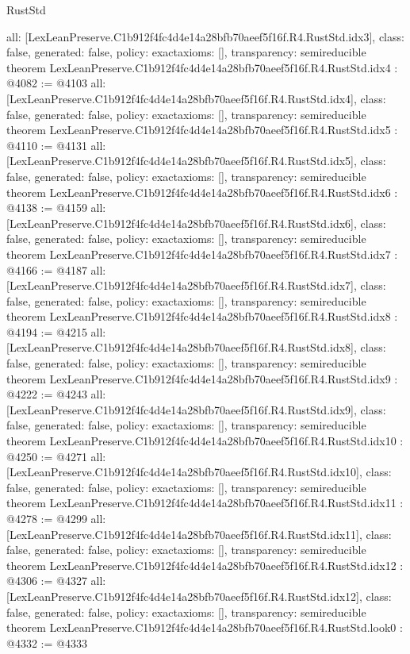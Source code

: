 \begin{lexlean}{RustStd}
\begin{coremodule}
{  all: [LexLeanPreserve.C1b912f4fc4d4e14a28bfb70aeef5f16f.R4.RustStd.idx3],
  class: false,
  generated: false,
  policy: exact{axioms: []},
  transparency: semireducible
}
theorem LexLeanPreserve.C1b912f4fc4d4e14a28bfb70aeef5f16f.R4.RustStd.idx4 : @4082 := @4103 {
  all: [LexLeanPreserve.C1b912f4fc4d4e14a28bfb70aeef5f16f.R4.RustStd.idx4],
  class: false,
  generated: false,
  policy: exact{axioms: []},
  transparency: semireducible
}
theorem LexLeanPreserve.C1b912f4fc4d4e14a28bfb70aeef5f16f.R4.RustStd.idx5 : @4110 := @4131 {
  all: [LexLeanPreserve.C1b912f4fc4d4e14a28bfb70aeef5f16f.R4.RustStd.idx5],
  class: false,
  generated: false,
  policy: exact{axioms: []},
  transparency: semireducible
}
theorem LexLeanPreserve.C1b912f4fc4d4e14a28bfb70aeef5f16f.R4.RustStd.idx6 : @4138 := @4159 {
  all: [LexLeanPreserve.C1b912f4fc4d4e14a28bfb70aeef5f16f.R4.RustStd.idx6],
  class: false,
  generated: false,
  policy: exact{axioms: []},
  transparency: semireducible
}
theorem LexLeanPreserve.C1b912f4fc4d4e14a28bfb70aeef5f16f.R4.RustStd.idx7 : @4166 := @4187 {
  all: [LexLeanPreserve.C1b912f4fc4d4e14a28bfb70aeef5f16f.R4.RustStd.idx7],
  class: false,
  generated: false,
  policy: exact{axioms: []},
  transparency: semireducible
}
theorem LexLeanPreserve.C1b912f4fc4d4e14a28bfb70aeef5f16f.R4.RustStd.idx8 : @4194 := @4215 {
  all: [LexLeanPreserve.C1b912f4fc4d4e14a28bfb70aeef5f16f.R4.RustStd.idx8],
  class: false,
  generated: false,
  policy: exact{axioms: []},
  transparency: semireducible
}
theorem LexLeanPreserve.C1b912f4fc4d4e14a28bfb70aeef5f16f.R4.RustStd.idx9 : @4222 := @4243 {
  all: [LexLeanPreserve.C1b912f4fc4d4e14a28bfb70aeef5f16f.R4.RustStd.idx9],
  class: false,
  generated: false,
  policy: exact{axioms: []},
  transparency: semireducible
}
theorem LexLeanPreserve.C1b912f4fc4d4e14a28bfb70aeef5f16f.R4.RustStd.idx10 : @4250 := @4271 {
  all: [LexLeanPreserve.C1b912f4fc4d4e14a28bfb70aeef5f16f.R4.RustStd.idx10],
  class: false,
  generated: false,
  policy: exact{axioms: []},
  transparency: semireducible
}
theorem LexLeanPreserve.C1b912f4fc4d4e14a28bfb70aeef5f16f.R4.RustStd.idx11 : @4278 := @4299 {
  all: [LexLeanPreserve.C1b912f4fc4d4e14a28bfb70aeef5f16f.R4.RustStd.idx11],
  class: false,
  generated: false,
  policy: exact{axioms: []},
  transparency: semireducible
}
theorem LexLeanPreserve.C1b912f4fc4d4e14a28bfb70aeef5f16f.R4.RustStd.idx12 : @4306 := @4327 {
  all: [LexLeanPreserve.C1b912f4fc4d4e14a28bfb70aeef5f16f.R4.RustStd.idx12],
  class: false,
  generated: false,
  policy: exact{axioms: []},
  transparency: semireducible
}
theorem LexLeanPreserve.C1b912f4fc4d4e14a28bfb70aeef5f16f.R4.RustStd.look0 : @4332 := @4333 {
}
\end{coremodule}
\end{lexlean}
